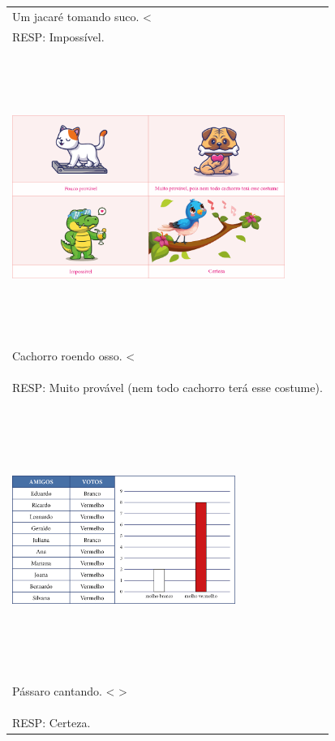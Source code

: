 \begin{longtable}[]{@{}l@{}}
\begin{minipage}[t]{0.97\columnwidth}
Um jacaré tomando suco. \textless{}
\end{minipage}\tabularnewline
RESP: Impossível.\tabularnewline
\begin{minipage}[t]{0.97\columnwidth}\raggedright\strut
\includegraphics[width=3.50000in,height=3.50000in]{media/image88.png}

Cachorro roendo osso. \textless{}
\end{minipage}\tabularnewline
RESP: Muito provável (nem todo cachorro terá esse
costume).\tabularnewline
\begin{minipage}[t]{0.97\columnwidth}\raggedright\strut
\includegraphics[width=2.86181in,height=3.30208in]{media/image89.png}

Pássaro cantando. \textless{}
\textgreater{}\strut
\end{minipage}\tabularnewline
RESP: Certeza.\tabularnewline
\bottomrule
\end{longtable}

